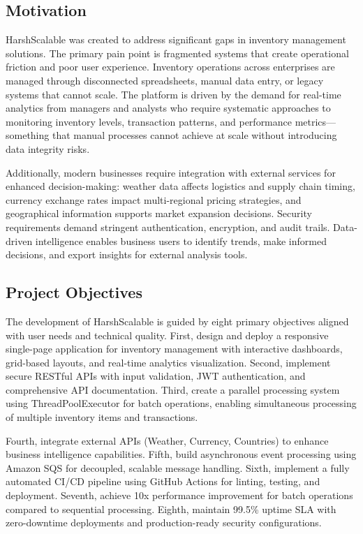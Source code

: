 \documentclass[conference]{IEEEtran}
\begin{document}
\subsection{Motivation}

HarshScalable was created to address significant gaps in inventory management solutions. The primary pain point is fragmented systems that create operational friction and poor user experience. Inventory operations across enterprises are managed through disconnected spreadsheets, manual data entry, or legacy systems that cannot scale. The platform is driven by the demand for real-time analytics from managers and analysts who require systematic approaches to monitoring inventory levels, transaction patterns, and performance metrics---something that manual processes cannot achieve at scale without introducing data integrity risks.

Additionally, modern businesses require integration with external services for enhanced decision-making: weather data affects logistics and supply chain timing, currency exchange rates impact multi-regional pricing strategies, and geographical information supports market expansion decisions. Security requirements demand stringent authentication, encryption, and audit trails. Data-driven intelligence enables business users to identify trends, make informed decisions, and export insights for external analysis tools.

\subsection{Project Objectives}

The development of HarshScalable is guided by eight primary objectives aligned with user needs and technical quality. First, design and deploy a responsive single-page application for inventory management with interactive dashboards, grid-based layouts, and real-time analytics visualization. Second, implement secure RESTful APIs with input validation, JWT authentication, and comprehensive API documentation. Third, create a parallel processing system using ThreadPoolExecutor for batch operations, enabling simultaneous processing of multiple inventory items and transactions.

Fourth, integrate external APIs (Weather, Currency, Countries) to enhance business intelligence capabilities. Fifth, build asynchronous event processing using Amazon SQS for decoupled, scalable message handling. Sixth, implement a fully automated CI/CD pipeline using GitHub Actions for linting, testing, and deployment. Seventh, achieve 10x performance improvement for batch operations compared to sequential processing. Eighth, maintain 99.5\% uptime SLA with zero-downtime deployments and production-ready security configurations.
\end{document}

